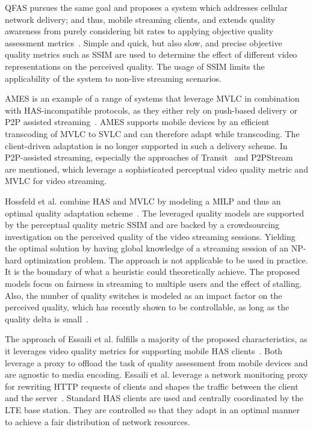 \ac{QFAS} pursues the same goal and proposes a system which addresses cellular network delivery; and thus, mobile streaming clients, and extends quality awareness from purely considering bit rates to applying objective quality assessment metrics~\cite{Cicalo2014}.
Simple and quick, but also slow, and precise objective quality metrics such as \ac{SSIM} are used to determine the effect of different video representations on the perceived quality.
The usage of \ac{SSIM} limits the applicability of the system to non-live streaming scenarios.

AMES is an example of a range of systems that leverage \ac{MVLC} in combination with \ac{HAS}-incompatible protocols, as they either rely on push-based delivery or \ac{P2P} assisted streaming~\cite{Fiandrotti2010,Medjiah2014,Wang2013,Wichtlhuber2014}.
AMES supports mobile devices by an efficient transcoding of \ac{MVLC} to \ac{SVLC} and can therefore adapt while transcoding.
The client-driven adaptation is no longer supported in such a delivery scheme.
In \ac{P2P}-assisted streaming, especially the approaches of Transit~\cite{Wichtlhuber2014} and P2PStream~\cite{Abboud2012} are mentioned, which leverage a sophisticated perceptual video quality metric and \ac{MVLC} for video streaming.

Hossfeld et al. combine \ac{HAS} and \ac{MVLC} by modeling a \ac{MILP} and thus an optimal quality adaptation scheme~\cite{Hossfeld2015a}.
The leveraged quality models are supported by the perceptual quality metric \ac{SSIM} and are backed by a crowdsourcing investigation on the perceived quality of the video streaming sessions.
Yielding the optimal solution by having global knowledge of a streaming session of an NP-hard optimization problem.
The approach is not applicable to be used in practice.
It is the boundary of what a heuristic could theoretically achieve. 
The proposed models focus on fairness in streaming to multiple users and the effect of stalling.
Also, the number of quality switches is modeled as an impact factor on the perceived quality, which has recently shown to be controllable, as long as the quality delta is small~\cite{Nam2016}.

The approach of Essaili et al. fulfills a majority of the proposed characteristics, as it leverages video quality metrics for supporting mobile \ac{HAS} clients~\cite{Essaili2013}. 
Both leverage a proxy to offload the task of quality assessment from mobile devices and are agnostic to media encoding. 
Essaili et al. leverage a network monitoring proxy for rewriting \ac{HTTP} requests of clients and shapes the traffic between the client and the server~\cite{Essaili2013}.
Standard \ac{HAS} clients are used and centrally coordinated by the \ac{LTE} base station.
They are controlled so that they adapt in an optimal manner to achieve a fair distribution of network resources.

